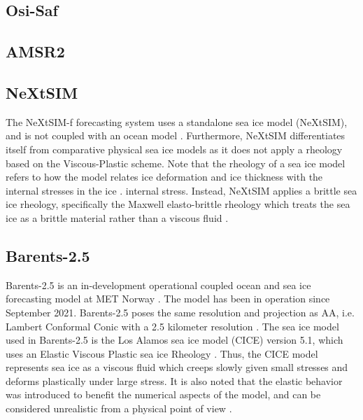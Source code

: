 \documentclass[../main/thesis.tex]{subfiles}
\begin{document}
\subsection{Osi-Saf}

\subsection{AMSR2}

\subsection{NeXtSIM}
The NeXtSIM-f forecasting system uses a standalone sea ice model (NeXtSIM), and is not coupled with an ocean model \cite{Williams2021}. Furthermore, NeXtSIM differentiates itself from comparative physical sea ice models as it does not apply a rheology based on the Viscous-Plastic scheme. Note that the rheology of a sea ice model refers to how the model relates ice deformation and ice thickness with the internal stresses in the ice \cite{Hibler1979}. internal stress. Instead, NeXtSIM applies a brittle sea ice rheology, specifically the Maxwell elasto-brittle rheology which treats the sea ice as a brittle material rather than a viscous fluid \cite{Dansereau2016}.



\subsection{Barents-2.5}
Barents-2.5 is an in-development operational coupled ocean and sea ice forecasting model at MET Norway \cite{Roehrs2022}. The model has been in operation since September 2021. Barents-2.5 poses the same resolution and projection as AA, i.e. Lambert Conformal Conic with a 2.5 kilometer resolution \cite{Roehrs2022,Mueller2017}. The sea ice model used in Barents-2.5 is the Los Alamos sea ice model (CICE) version 5.1, which uses an Elastic Viscous Plastic sea ice Rheology \cite{Hunke2015}. Thus, the CICE model represents sea ice as a viscous fluid which creeps slowly given small stresses and deforms plastically under large stress. It is also noted that the elastic behavior was introduced to benefit the numerical aspects of the model, and can be considered unrealistic from a physical point of view \cite{Hunke1997}.
\end{document}
